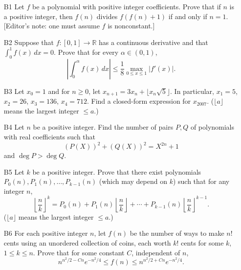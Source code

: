 \documentclass[amssymb,twocolumn,pra,10pt,aps]{revtex4-1}
\begin{document}
\begin{itemize}
\item[B1]
Let $f$ be a polynomial with positive integer coefficients. Prove
that if $n$ is a positive integer, then $f(n)$ divides $f(f(n)+1)$ if
and only if $n=1$. [Editor's note: one must assume $f$ is nonconstant.]

\item[B2]
Suppose that $f: [0,1] \to \mathbb{R}$ has a continuous derivative
and that $\int_0^1 f(x)\,dx = 0$. Prove that for every $\alpha \in (0,1)$,
\[
\left| \int_0^\alpha f(x)\,dx \right| \leq \frac{1}{8} \max_{0 \leq x
\leq 1} |f'(x)|.
\]

\item[B3]
Let $x_0 = 1$ and for $n \geq 0$, let $x_{n+1} = 3x_n + \lfloor x_n
\sqrt{5} \rfloor$. In particular, $x_1 = 5$, $x_2 = 26$, $x_3 = 136$,
$x_4 = 712$. Find a closed-form expression for $x_{2007}$. ($\lfloor a
\rfloor$ means the largest integer $\leq a$.)

\item[B4]
Let $n$ be a positive integer. Find the number of pairs $P, Q$ of
polynomials with real coefficients such that
\[
(P(X))^2 + (Q(X))^2 = X^{2n} + 1
\]
and $\deg P > \deg Q$.

\item[B5]
Let $k$ be a positive integer. Prove that there exist polynomials
$P_0(n), P_1(n), \dots, P_{k-1}(n)$ (which may depend on $k$) such that
for any integer $n$,
\[
\left\lfloor \frac{n}{k} \right\rfloor^k = P_0(n) + P_1(n) \left\lfloor
\frac{n}{k} \right\rfloor + \cdots + P_{k-1}(n) \left\lfloor \frac{n}{k}
\right\rfloor^{k-1}.
\]
($\lfloor a \rfloor$ means the largest integer $\leq a$.)

\item[B6]
For each positive integer $n$, let $f(n)$ be the number of ways to
make $n!$ cents using an unordered collection of coins, each worth $k!$
cents for some $k$, $1 \leq k \leq n$. Prove that for some constant $C$,
independent of $n$,
\[
n^{n^2/2 - Cn} e^{-n^2/4} \leq f(n) \leq n^{n^2/2 + Cn}e^{-n^2/4}.
\]

\end{itemize}
\end{document}
